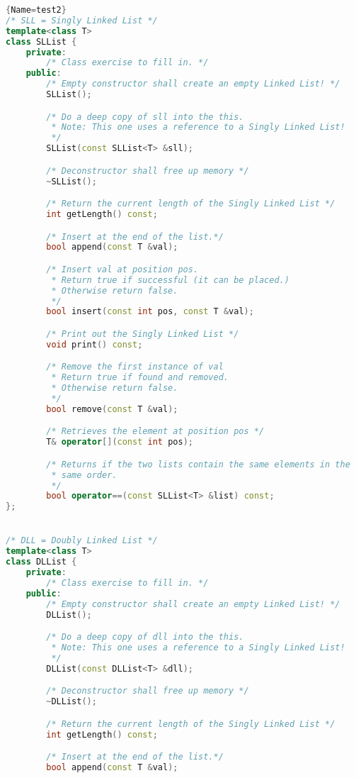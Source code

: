 \documentclass[12pt]{article}
\begin{document}
\begin{lstlisting}[language=C++]{Name=test2}
/* SLL = Singly Linked List */
template<class T>
class SLList {
    private:
        /* Class exercise to fill in. */
    public:
        /* Empty constructor shall create an empty Linked List! */
        SLList();

        /* Do a deep copy of sll into the this.
         * Note: This one uses a reference to a Singly Linked List!
         */
        SLList(const SLList<T> &sll);

        /* Deconstructor shall free up memory */
        ~SLList();

        /* Return the current length of the Singly Linked List */
        int getLength() const;

        /* Insert at the end of the list.*/
        bool append(const T &val);

        /* Insert val at position pos.
         * Return true if successful (it can be placed.)
         * Otherwise return false.
         */
        bool insert(const int pos, const T &val);

        /* Print out the Singly Linked List */
        void print() const;

        /* Remove the first instance of val
         * Return true if found and removed.
         * Otherwise return false.
         */
        bool remove(const T &val);

        /* Retrieves the element at position pos */
        T& operator[](const int pos);

        /* Returns if the two lists contain the same elements in the
         * same order.
         */
        bool operator==(const SLList<T> &list) const;
};


/* DLL = Doubly Linked List */
template<class T>
class DLList {
    private:
        /* Class exercise to fill in. */
    public:
        /* Empty constructor shall create an empty Linked List! */
        DLList();

        /* Do a deep copy of dll into the this.
         * Note: This one uses a reference to a Singly Linked List!
         */
        DLList(const DLList<T> &dll);

        /* Deconstructor shall free up memory */
        ~DLList();

        /* Return the current length of the Singly Linked List */
        int getLength() const;

        /* Insert at the end of the list.*/
        bool append(const T &val);


\end{lstlisting}
\end{document}
